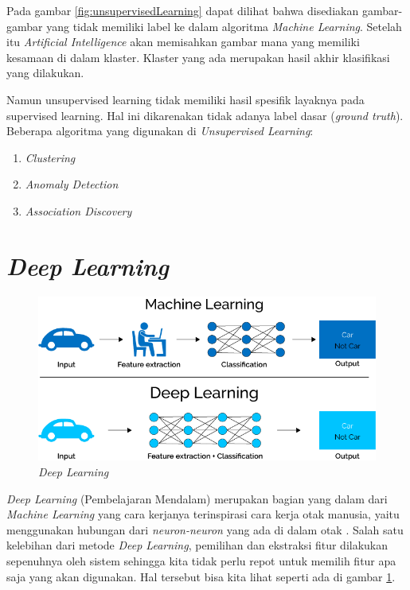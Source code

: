   Pada gambar \ref{fig:unsupervisedLearning} dapat dilihat bahwa disediakan gambar-gambar yang tidak memiliki label ke dalam algoritma \textit{Machine Learning}.
  Setelah itu \textit{Artificial Intelligence} akan memisahkan gambar mana yang memiliki kesamaan di dalam klaster.
  Klaster yang ada merupakan hasil akhir klasifikasi yang dilakukan.

  Namun unsupervised learning tidak memiliki hasil spesifik layaknya pada supervised learning.
  Hal ini dikarenakan tidak adanya label dasar (\textit{ground truth}).
  Beberapa algoritma yang digunakan di \textit{Unsupervised Learning}:

    \begin{enumerate}[nolistsep]
      
      \item \textit{Clustering}

      \item \textit{Anomaly Detection}

      \item \textit{Association Discovery}

    \end{enumerate}

\section{\textit{Deep Learning}}

  \begin{figure}[hbt!] \centering
    \includegraphics[scale=0.3]{gambar/deeplearning.png}
    \caption{\textit{Deep Learning} \cite{xenonstack_2021}}
    \label{fig:deeplearning}
  \end{figure}

\textit{Deep Learning} (Pembelajaran Mendalam) merupakan bagian yang dalam dari \textit{Machine Learning} yang cara kerjanya terinspirasi cara kerja otak manusia, yaitu menggunakan hubungan dari \textit{neuron-neuron} yang ada di dalam otak \cite{deepAI}.
Salah satu kelebihan dari metode \textit{Deep Learning}, pemilihan dan ekstraksi fitur dilakukan sepenuhnya oleh sistem sehingga kita tidak perlu repot untuk memilih fitur apa saja yang akan digunakan.
Hal tersebut bisa kita lihat seperti ada di gambar \ref{fig:deeplearning}.

